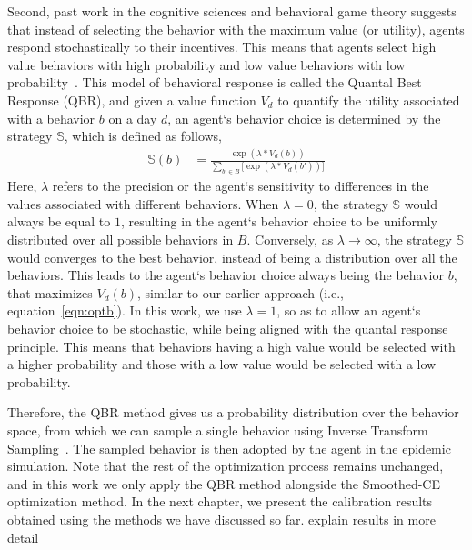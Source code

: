 \documentclass[doublespace,draft]{VTthesis}
\begin{document}
    Second, past work in the cognitive sciences and behavioral game theory suggests that instead of selecting the behavior with the maximum value (or utility), agents respond stochastically to their incentives. This means that agents select high value behaviors with high probability and low value behaviors with low probability~\cite{wright2014level}. This model of behavioral response is called the Quantal Best Response (QBR), and given a value function $V_d$ to quantify the utility associated with a behavior $b$ on a day $d$, an agent`s behavior choice is determined by the strategy $\mathbb{S}$, which is defined as follows,
    \begin{align}
        \mathbb{S}(b) &= \frac{\exp (\lambda * V_d(b)) }{ \sum\limits_{b' \in B} \big[ \exp(\lambda * V_d(b')) \big]}
    	\label{eqn:qbr}
    \end{align}
    Here, $\lambda$ refers to the precision or the agent`s sensitivity to differences in the values associated with different behaviors. When $\lambda = 0$, the strategy $\mathbb{S}$ would always be equal to $1$, resulting in the agent`s behavior choice to be uniformly distributed over all possible behaviors in $B$. Conversely, as $\lambda \rightarrow \infty$, the strategy $\mathbb{S}$ would converges to the best behavior, instead of being a distribution over all the behaviors. This leads to the agent`s behavior choice always being the behavior $b$, that maximizes $V_d(b)$, similar to our earlier approach (i.e., equation~\ref{eqn:optb}). In this work, we use $\lambda = 1$, so as to allow an agent`s behavior choice to be stochastic, while being aligned with the quantal response principle. This means that behaviors having a high value would be selected with a higher probability and those with a low value would be selected with a low probability.
    
    Therefore, the QBR method gives us a probability distribution over the behavior space, from which we can sample a single behavior using Inverse Transform Sampling~\cite{wiki:its}. The sampled behavior is then adopted by the agent in the epidemic simulation. Note that the rest of the optimization process remains unchanged, and in this work we only apply the QBR method alongside the Smoothed-CE optimization method. In the next chapter, we present the calibration results obtained using the methods we have discussed so far. explain results in more detail
    
\end{document}
